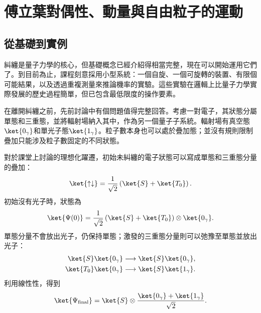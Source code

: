 \chapter{傅立葉對偶性、動量與自由粒子的運動}

\section{從基礎到實例}

糾纏是量子力學的核心，但基礎概念已經介紹得相當完整，現在可以開始運用它們了。到目前為止，課程刻意採用小型系統：一個自旋、一個可旋轉的裝置、有限個可能結果，以及透過重複測量來推論機率的實驗。這些實驗在邏輯上比量子力學實際發展的歷史過程簡單，但已包含最低限度的操作要素。

\begin{classroomqa}
\end{classroomqa}

\begin{classroomqa}
\end{classroomqa}

在離開糾纏之前，先前討論中有個問題值得完整回答。考慮一對電子，其狀態分屬單態和三重態，並將輻射場納入其中，作為另一個量子子系統。輻射場有真空態\(\ket{0_\gamma}\)和單光子態\(\ket{1_\gamma}\)。粒子數本身也可以處於疊加態；並沒有規則限制疊加只能涉及粒子數固定的不同狀態。

對於課堂上討論的理想化躍遷，初始未糾纏的電子狀態可以寫成單態和三重態分量的疊加：
\begin{equation}
\ket{\uparrow\downarrow}
=
\frac{1}{\sqrt{2}}
\left(\ket{S}+\ket{T_0}\right).
\end{equation}
初始沒有光子時，狀態為
\begin{equation}
\ket{\Psi(0)}
=
\frac{1}{\sqrt{2}}
\left(\ket{S}+\ket{T_0}\right)
\otimes\ket{0_\gamma}.
\label{eq:l9-initial-radiative-state}
\end{equation}
單態分量不會放出光子，仍保持單態；激發的三重態分量則可以弛豫至單態並放出光子：
\begin{align}
\ket{S}\ket{0_\gamma}
&\longrightarrow
\ket{S}\ket{0_\gamma}, \\
\ket{T_0}\ket{0_\gamma}
&\longrightarrow
\ket{S}\ket{1_\gamma}.
\end{align}
利用線性性，得到
\begin{equation}
\ket{\Psi_{\mathrm{final}}}
=
\ket{S}\otimes
\frac{\ket{0_\gamma}+\ket{1_\gamma}}{\sqrt{2}}.
\label{eq:l9-final-radiative-state}
\end{equation}

